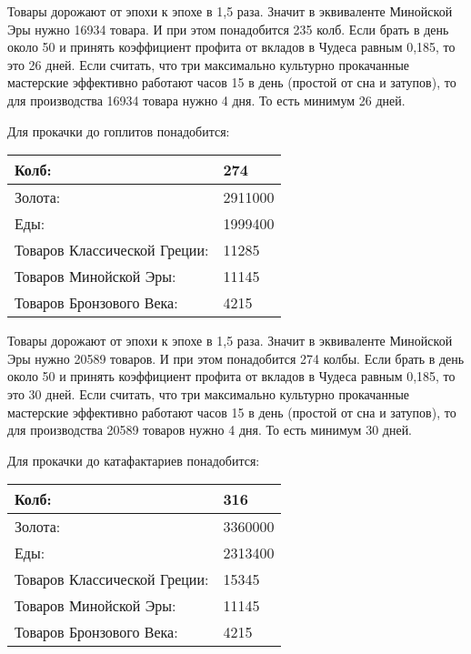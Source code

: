 Товары дорожают от эпохи к эпохе в 1,5 раза.
Значит в эквиваленте Минойской Эры нужно 16934 товара.
И при этом понадобится 235 колб. Если брать в день около 50 и принять коэффициент профита от вкладов
в Чудеса равным 0,185, то это 26 дней.
Если считать, что три максимально культурно прокачанные мастерские эффективно работают часов 15 в день (простой от сна и затупов),
то для производства 16934 товара нужно 4 дня.
То есть минимум 26 дней.


Для прокачки до гоплитов понадобится:

\begin{center}
    \begin{tabular}[h!]{|l|l|}
        \hline
        Колб:   & 274 \\\hline
        Золота: & 2911000 \\\hline
        Еды:    & 1999400 \\\hline
        Товаров Классической Греции: & 11285 \\\hline
        Товаров Минойской Эры: & 11145 \\\hline
        Товаров Бронзового Века: & 4215 \\\hline
    \end{tabular}
\end{center}

Товары дорожают от эпохи к эпохе в 1,5 раза.
Значит в эквиваленте Минойской Эры нужно 20589 товаров.
И при этом понадобится 274 колбы. Если брать в день около 50 и принять коэффициент профита от вкладов
в Чудеса равным 0,185, то это 30 дней.
Если считать, что три максимально культурно прокачанные мастерские эффективно работают часов 15 в день (простой от сна и затупов),
то для производства 20589 товаров нужно 4 дня.
То есть минимум 30 дней.


Для прокачки до катафактариев понадобится:

\begin{center}
    \begin{tabular}[h!]{|l|l|}
        \hline
        Колб:   & 316 \\\hline
        Золота: & 3360000 \\\hline
        Еды:    & 2313400 \\\hline
        Товаров Классической Греции: & 15345 \\\hline
        Товаров Минойской Эры: & 11145 \\\hline
        Товаров Бронзового Века: & 4215 \\\hline
    \end{tabular}
\end{center}


